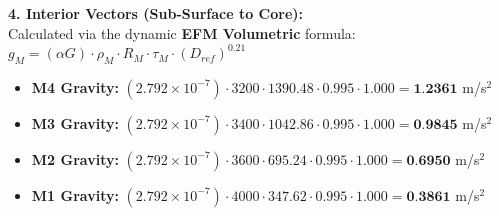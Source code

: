 \documentclass[11pt, a4paper]{article}
\begin{document}
  \vspace{0.5em}
  \noindent \textbf{4. Interior Vectors (Sub-Surface to Core):} \\[0.5em]
  \hspace*{1em} Calculated via the dynamic \textbf{EFM Volumetric} formula: $g_M = (\alpha G) \cdot \rho_{M} \cdot R_M \cdot \tau_M \cdot (D_{ref})^{0.21}$
  \begin{itemize}
    \item \textbf{M4 Gravity:} $(2.792 \times 10^{-7}) \cdot 3200 \cdot 1390.48 \cdot 0.995 \cdot 1.000 = \textbf{1.2361}$ m/s$^2$
    \item \textbf{M3 Gravity:} $(2.792 \times 10^{-7}) \cdot 3400 \cdot 1042.86 \cdot 0.995 \cdot 1.000 = \textbf{0.9845}$ m/s$^2$
    \item \textbf{M2 Gravity:} $(2.792 \times 10^{-7}) \cdot 3600 \cdot 695.24 \cdot 0.995 \cdot 1.000 = \textbf{0.6950}$ m/s$^2$
    \item \textbf{M1 Gravity:} $(2.792 \times 10^{-7}) \cdot 4000 \cdot 347.62 \cdot 0.995 \cdot 1.000 = \textbf{0.3861}$ m/s$^2$
  \end{itemize}
\end{document}
